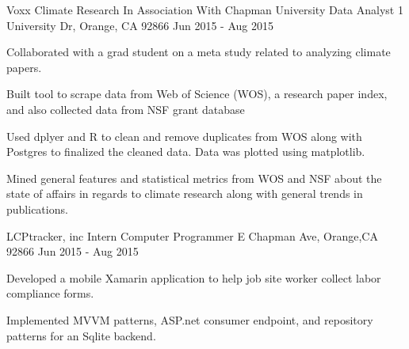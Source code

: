 \begin{cventries}
  \cventry
    {Voxx Climate Research In Association With Chapman University} %
    {Data Analyst} %
    {1 University Dr, Orange, CA 92866} %
    { Jun 2015 - Aug 2015} %
    {
      \begin{cvitems} %
        \item {Collaborated with a grad student on a meta study related to analyzing climate papers.}
        \item {Built tool to scrape data from Web of Science (WOS), a research paper index, and also collected data from NSF grant database}
        \item {Used dplyer and R to clean and remove duplicates from WOS along with Postgres to finalized the cleaned data. Data was plotted using matplotlib.}
        \item {Mined general features and statistical metrics from WOS and NSF about the state of affairs in regards to climate research along with general trends in publications.}
      \end{cvitems}
    }
  \cventry
    {LCPtracker, inc} %
    {Intern Computer Programmer} %
    {E Chapman Ave, Orange,CA 92866} %
    {Jun 2015 - Aug 2015} %
    {
      \begin{cvitems} %
        \item{Developed a mobile Xamarin application to help job site worker collect labor compliance forms.}
        \item{Implemented MVVM patterns, ASP.net consumer endpoint, and repository patterns for an Sqlite backend.}
      \end{cvitems}
    }
    
    

\end{cventries}
